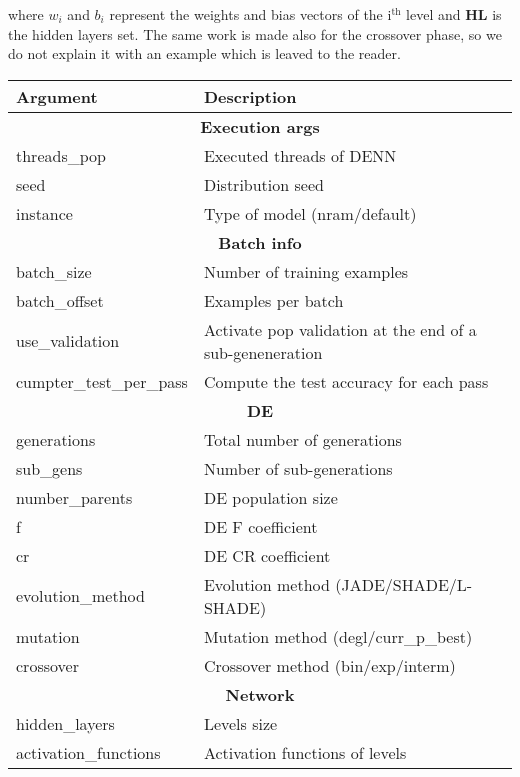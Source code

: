 where $w_i$ and $b_i$ represent the weights and bias vectors of the $\textrm{i}^{\textrm{th}}$ level and \textbf{HL} is the hidden layers set. The same work is made also for the crossover phase, so we do not explain it with an example which is leaved to the reader.

\begin{table}[]
\centering
\label{my-label}
\begin{tabular}{|l|l|}
\hline
Argument     & Description \\ \hline \hline

\multicolumn{2}{|c|}{\textbf{Execution args}} \\ \hline
threads\_pop & Executed threads of DENN \\ \hline
seed     	 & Distribution seed \\ \hline
instance		 & Type of model (nram/default) \\ \hline \hline

\multicolumn{2}{|c|}{\textbf{Batch info}} \\ \hline
batch\_size  	 & Number of training examples \\ \hline
batch\_offset	 & Examples per batch \\ \hline
use\_validation & Activate pop validation at the end of a sub-geneneration \\ \hline
cumpter\_test\_per\_pass     	 & Compute the test accuracy for each pass \\ \hline \hline

\multicolumn{2}{|c|}{\textbf{DE}} \\ \hline
generations  	 & Total number of generations \\ \hline
sub\_gens  	 	& Number of sub-generations \\ \hline
number\_parents  	 	& DE population size \\ \hline
f						& DE F coefficient \\ \hline
cr						& DE CR coefficient \\ \hline
evolution\_method 		& Evolution method (JADE/SHADE/L-SHADE) \\ \hline
mutation 				& Mutation method (degl/curr\_p\_best) \\ \hline
crossover				& Crossover method (bin/exp/interm) \\ \hline

\multicolumn{2}{|c|}{\textbf{Network}} \\ \hline
hidden\_layers  	 		& Levels size \\ \hline
activation\_functions  	& Activation functions of levels \\ \hline


\end{tabular}
\end{table}
